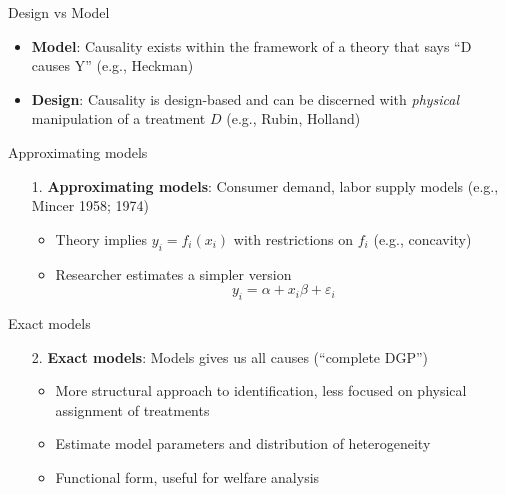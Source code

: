 \documentclass{beamer}
\begin{document}
\begin{frame}{Design vs Model}

  \begin{itemize}
    \item \textbf{Model}: Causality exists within the framework of a theory that says ``D causes Y'' (e.g., Heckman)
    \item \textbf{Design}: Causality is design-based and can be discerned with \emph{physical} manipulation of a treatment $D$ (e.g., Rubin, Holland)
  \end{itemize}
\end{frame}


\begin{frame}{Approximating models}

  \begin{enumerate}
    \item[1. ] \textbf{Approximating models}: Consumer demand, labor supply models (e.g., Mincer 1958; 1974)
          \begin{itemize}
            \item Theory implies $y_i=f_i(x_i)$ with restrictions on $f_i$ (e.g., concavity)
            \item Researcher estimates a simpler version $$y_i = \alpha + x_i \beta + \varepsilon_i$$
          \end{itemize}
  \end{enumerate}

\end{frame}

\begin{frame}{Exact models}

  \begin{enumerate}
    \item[2. ] \textbf{Exact models}: Models gives us all causes (``complete DGP'')
          \begin{itemize}
            \item More structural approach to identification, less focused on physical assignment of treatments
            \item Estimate model parameters and distribution of heterogeneity
            \item Functional form, useful for welfare analysis
          \end{itemize}
  \end{enumerate}

\end{frame}
\end{document}
